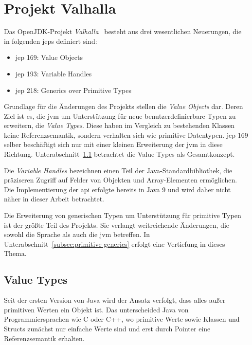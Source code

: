\section{Projekt Valhalla}\label{sec:valhalla}

Das OpenJDK-Projekt \emph{Valhalla}~\cite{openjdk-valhalla} besteht aus drei wesentlichen Neuerungen, die in folgenden \acp{jep} definiert sind:

\begin{itemize}
    \itemsep0em
    \item \ac{jep} 169: Value Objects~\cite{jep-169}
    \item \ac{jep} 193: Variable Handles~\cite{jep-193}
    \item \ac{jep} 218: Generics over Primitive Types~\cite{jep-218}
\end{itemize}

Grundlage für die Änderungen des Projekts stellen die \emph{Value Objects} dar.
Deren Ziel ist es, die \ac{jvm} um Unterstützung für neue benutzerdefinierbare Typen zu erweitern, die \emph{Value Types}.
Diese haben im Vergleich zu bestehenden Klassen keine Referenzsemantik, sondern verhalten sich wie primitive Datentypen.
\ac{jep} 169 selber beschäftigt sich nur mit einer kleinen Erweiterung der \ac{jvm} in diese Richtung.
Unterabschnitt~\ref{subsec:value-types} betrachtet die Value Types als Gesamtkonzept.

Die \emph{Variable Handles} bezeichnen einen Teil der Java-Standardbibliothek, die präziseren Zugriff auf Felder von Objekten und Array-Elementen ermöglichen.
Die Implementierung der \ac{api} erfolgte bereits in Java 9 und wird daher nicht näher in dieser Arbeit betrachtet.

Die Erweiterung von generischen Typen um Unterstützung für primitive Typen ist der größte Teil des Projekts.
Sie verlangt weitreichende Änderungen, die sowohl die Sprache als auch die \ac{jvm} betreffen.
In Unterabschnitt~\ref{subsec:primitive-generics} erfolgt eine Vertiefung in dieses Thema.

\subsection{Value Types}\label{subsec:value-types}

Seit der ersten Version von Java wird der Ansatz verfolgt, dass alles außer primitiven Werten ein Objekt ist.
Das unterscheided Java von Programmiersprachen wie C oder C++, wo primitive Werte sowie Klassen und Structs zunächst nur einfache Werte sind und erst durch Pointer eine Referenzsemantik erhalten.

